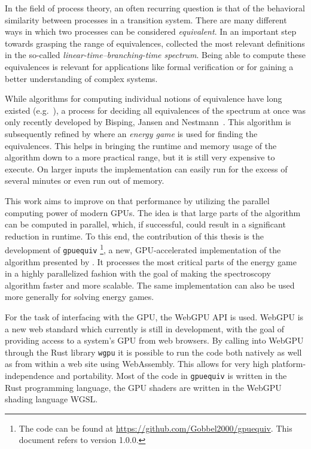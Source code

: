 In the field of process theory,
an often recurring question is that of
the behavioral similarity between processes in a transition system.
There are many different ways in which two processes can be considered
\emph{equivalent}.
In an important step towards grasping the range of equivalences,
\textcite{glabbeek1990spectrum} collected the most relevant definitions in the
so-called \emph{linear-time--branching-time spectrum}.
Being able to compute these equivalences is relevant for applications like
formal verification
or for gaining a better understanding of complex systems.

While algorithms for computing individual notions of equivalence
have long existed (e.g.~\cite{Blom2002}),
a process for deciding all equivalences of the spectrum at once
was only recently developed
by Bisping, Jansen and Nestmann~\cite{Bisping2022}.
This algorithm is subsequently refined by \textcite{bisping2023process}
where an \emph{energy game} is used for finding the equivalences.
This helps in bringing the runtime and memory usage of the algorithm down
to a more practical range,
but it is still very expensive to execute.
On larger inputs the implementation can easily run for the excess of several
minutes or even run out of memory.

This work aims to improve on that performance by utilizing the parallel
computing power of modern GPUs.
The idea is that large parts of the algorithm can be computed in parallel,
which, if successful, could result in a significant reduction in runtime.
To this end, the contribution of this thesis is the development
of \texttt{gpuequiv}%
\footnote{The code can be found at \url{https://github.com/Gobbel2000/gpuequiv}.
This document refers to version 1.0.0.},
a new, GPU-accelerated implementation
of the algorithm presented by \textcite{bisping2023process}.
It processes the most critical parts of the energy game in a highly
parallelized fashion
with the goal of making the spectroscopy algorithm faster and more scalable.
The same implementation can also be used more generally for solving energy
games.

For the task of interfacing with the GPU,
the WebGPU API is used.
WebGPU is a new web standard which currently is still in development,
with the goal of providing access to a system's GPU from web browsers.
By calling into WebGPU through the Rust library \texttt{wgpu} it is possible to
run the code both natively as well as from within a web site using WebAssembly.
This allows for very high platform-independence and portability.
Most of the code in \texttt{gpuequiv} is written in the
Rust programming language,
the GPU shaders are written in the WebGPU shading language WGSL\@.

